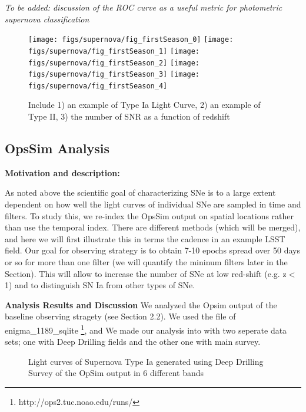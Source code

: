 \emph{To be added: discussion of the ROC curve as a useful metric for photometric supernova 
classification}


\begin{figure}[!hb]
    \begin{minipage}[b]{\linewidth}
        \texttt{[image: figs/supernova/fig\_firstSeason\_0]}
        \texttt{[image: figs/supernova/fig\_firstSeason\_1]}
        \texttt{[image: figs/supernova/fig\_firstSeason\_2]}
        \texttt{[image: figs/supernova/fig\_firstSeason\_3]}
        \texttt{[image: figs/supernova/fig\_firstSeason\_4]}
    \end{minipage}
\label{fig:opsimSummary}
\caption{Include 1) an example of Type Ia Light Curve, 2) an example of Type II, 3) the number of SNR as a function of
redshift}
\end{figure}



\subsection{OpsSim Analysis}
\label{sec:keyword:analysis}

{\bf Motivation and description:}

As noted above the scientific goal of characterizing SNe is to a large extent
dependent on how well the light curves of individual SNe are sampled in
time and filters. To study this, we re-index the OpsSim output on spatial
locations rather than use the temporal index. There are different methods (which will be merged), and here we will first illustrate this in terms the cadence in an example LSST field.
Our goal for observing strategy is to obtain 7-10 epochs spread over 50 days or so for more than one filter (we will quantify the mininum filters later in the Section). This will allow to increase the number of SNe at low red-shift (e.g. z$<$ 1) and to distinguish SN Ia from other types of SNe.

{\bf Analysis Results and Discussion}
We analyzed the Opsim output of the  baseline observing stragety (see Section 2.2). 
We used the file of enigma\_1189\_sqlite {\footnote {http://ops2.tuc.noao.edu/runs/}}, and 
We made our analysis into with two seperate data sets; one with Deep Drilling fields and the other one with main survey.

\begin{figure}[tbh!]
\vskip -1.3in
\vskip -1.3in
\caption{Light curves of Supernova Type Ia generated using Deep Drilling Survey of the OpSim output in 6 different bands
}
\label{fig:SNIaLCopsimdeep}
\end{figure}



